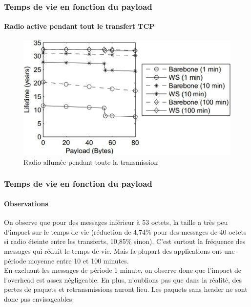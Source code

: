 \begin{frame}
 \frametitle{Temps de vie en fonction du payload}
 \framesubtitle{Radio active pendant tout le transfert TCP}
 \begin{figure}
  \centering
  \includegraphics[scale=\radiosca]{figures/radioon.jpg}
  \caption{Radio allumée pendant toute la transmission}
 \end{figure} 
\end{frame}

\begin{frame}
 \frametitle{Temps de vie en fonction du payload}
 \framesubtitle{Observations}
 On observe que pour des messages inférieur à 53 octets, la taille a très peu d'impact sur le temps de vie
 (réduction de 4,74\% pour des messages de 40 octets si radio éteinte entre les transferts, 10,85\% sinon).
 C'est surtout la fréquence des messages qui réduit le temps de vie. Mais la plupart des applications ont une période moyenne entre 10 et 100 minutes.\\
 \vspace{5mm}
 En excluant les messages de période 1 minute, on observe donc que l'impact de l'overhead est assez négligeable.
 En plus, n'oublions pas que dans la réalité, des pertes de paquets et retransmissions auront lieu.
 Les paquets sans header ne sont donc pas envisageables.
\end{frame}

